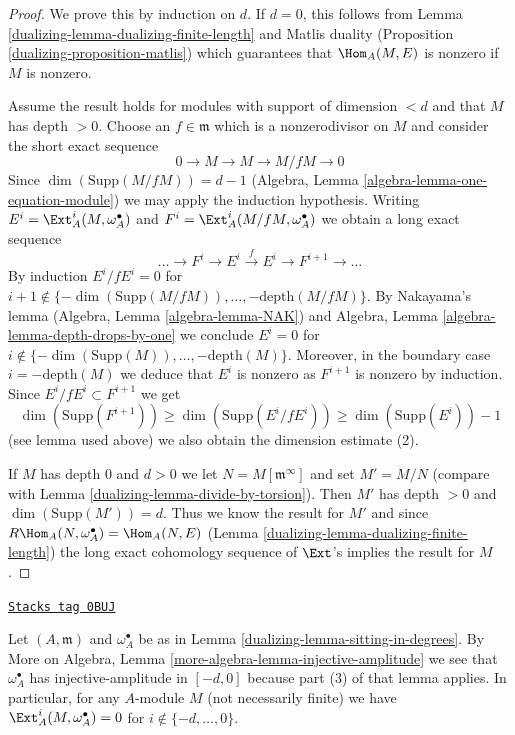 \begin{proof}

We prove this by induction on $d$. If $d = 0$, this follows from
Lemma \ref{dualizing-lemma-dualizing-finite-length} and Matlis duality
(Proposition \ref{dualizing-proposition-matlis}) which guarantees that
$\Hom_A(M, E)$ is nonzero if $M$ is nonzero.

\medskip\noindent
Assume the result holds for modules with support of dimension $< d$ and that
$M$ has depth $> 0$. Choose an $f \in \mathfrak m$ which is a nonzerodivisor
on $M$ and consider the short exact sequence
$$
0 \to M \to M \to M/fM \to 0
$$
Since $\dim(\text{Supp}(M/fM)) = d - 1$
(Algebra, Lemma \ref{algebra-lemma-one-equation-module}) we
may apply the induction hypothesis.
Writing
$E^i = \Ext^i_A(M, \omega_A^\bullet)$ and
$F^i = \Ext^i_A(M/fM, \omega_A^\bullet)$
we obtain a long exact sequence
$$
\ldots \to F^i \to E^i \xrightarrow{f} E^i \to F^{i + 1} \to \ldots
$$
By induction $E^i/fE^i = 0$ for
$i + 1 \not \in \{-\dim(\text{Supp}(M/fM)), \ldots, -\text{depth}(M/fM)\}$.
By Nakayama's lemma (Algebra, Lemma \ref{algebra-lemma-NAK})
and Algebra, Lemma \ref{algebra-lemma-depth-drops-by-one}
we conclude $E^i = 0$ for
$i \not \in \{-\dim(\text{Supp}(M)), \ldots, -\text{depth}(M)\}$.
Moreover, in the boundary case $i = - \text{depth}(M)$ we deduce that $E^i$
is nonzero as $F^{i + 1}$ is nonzero by induction.
Since $E^i/fE^i \subset F^{i + 1}$ we get
$$
\dim(\text{Supp}(F^{i + 1})) \geq \dim(\text{Supp}(E^i/fE^i))
\geq \dim(\text{Supp}(E^i)) - 1
$$
(see lemma used above) we also obtain the dimension estimate (2).

\medskip\noindent
If $M$ has depth $0$ and $d > 0$ we let $N = M[\mathfrak m^\infty]$ and set
$M' = M/N$ (compare with Lemma \ref{dualizing-lemma-divide-by-torsion}).
Then $M'$ has depth $> 0$ and $\dim(\text{Supp}(M')) = d$.
Thus we know the result for $M'$ and since
$R\Hom_A(N, \omega_A^\bullet) = \Hom_A(N, E)$
(Lemma \ref{dualizing-lemma-dualizing-finite-length})
the long exact cohomology sequence of $\Ext$'s implies the
result for $M$.
\end{proof}

\begin{remark}
\label{dualizing-remark-vanishing-for-arbitrary-modules}
\href{https://stacks.math.columbia.edu/tag/0BUJ}{\texttt{Stacks tag 0BUJ}}

Let $(A, \mathfrak m)$ and $\omega_A^\bullet$ be as in
Lemma \ref{dualizing-lemma-sitting-in-degrees}.
By More on Algebra, Lemma \ref{more-algebra-lemma-injective-amplitude}
we see that $\omega_A^\bullet$ has injective-amplitude in $[-d, 0]$
because part (3) of that lemma applies.
In particular, for any $A$-module $M$ (not necessarily finite) we have
$\Ext^i_A(M, \omega_A^\bullet) = 0$ for $i \not \in \{-d, \ldots, 0\}$.
\end{remark}

